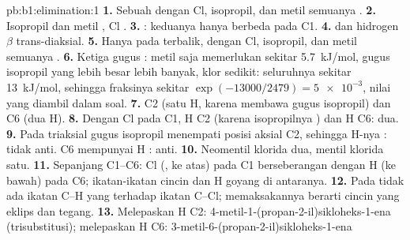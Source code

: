 \begin{solution}{pb:b1:elimination:1}
\textbf{1.} Sebuah  dengan Cl, isopropil, dan metil semuanya
.
\textbf{2.} Isopropil dan metil , Cl .
\textbf{3.} : keduanya hanya berbeda pada C1.
\textbf{4.}  dan hidrogen $\beta$ trans-diaksial.
\textbf{5.} Hanya pada  terbalik, dengan Cl, isopropil, dan metil
semuanya .
\textbf{6.} Ketiga gugus : metil saja memerlukan sekitar
\qty{5.7}{kJ/mol}, gugus isopropil yang lebih besar lebih banyak, klor
sedikit: seluruhnya sekitar \qty{13}{kJ/mol}, sehingga fraksinya sekitar
$\exp(-13000/2479) = \num{5e-3}$, nilai yang diambil dalam soal.
\textbf{7.} C2 (satu H, karena membawa gugus isopropil) dan C6 (dua H).
\textbf{8.} Dengan Cl  pada C1, H  C2 (karena isopropilnya
) dan H  C6: dua.
\textbf{9.} Pada  triaksial gugus isopropil menempati posisi aksial
C2, sehingga H-nya : tidak anti. C6 mempunyai H : anti.
\textbf{10.} Neomentil klorida dua, mentil klorida satu.
\textbf{11.} Sepanjang C1--C6: Cl (, ke atas) pada C1 berseberangan
dengan H  (ke bawah) pada C6; ikatan-ikatan cincin dan H
 goyang di antaranya.
\textbf{12.} Pada  tidak ada ikatan C--H yang 
terhadap ikatan C--Cl; memaksakannya berarti cincin yang eklips dan
tegang.
\textbf{13.} Melepaskan H C2: 4-metil-1-(propan-2-il)sikloheks-1-ena
(trisubstitusi); melepaskan H C6: 3-metil-6-(propan-2-il)sikloheks-1-ena

\end{solution}
